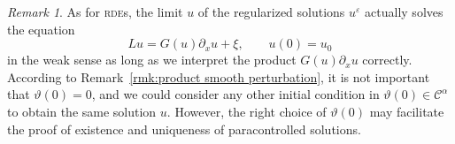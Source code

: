 \documentclass[a4paper,11pt]{article}
\theoremstyle{remark}
\newtheorem{remark}[theorem]{Remark}
\newcommand{\CC}{\ensuremath{\mathscr{C}}}
\begin{document}
\begin{remark}
  As for \textsc{rde}s, the limit $u$ of the regularized solutions $u^{\varepsilon}$ actually solves the equation
  \[
     L u=G ( u ) \partial_{x} u+ \xi , \hspace{2em} u ( 0 ) =u_{0}
  \]
  in the weak sense as long as we interpret the product $G ( u ) \partial_{x} u$ correctly. According to Remark~\ref{rmk:product smooth perturbation}, it is not important that $\vartheta(0) = 0$, and we could consider any other initial condition in $\vartheta(0) \in \CC^\alpha$ to obtain the same solution $u$. However, the right choice of $\vartheta(0)$ may facilitate the proof of existence and uniqueness of paracontrolled solutions.%
\end{remark}
\end{document}
